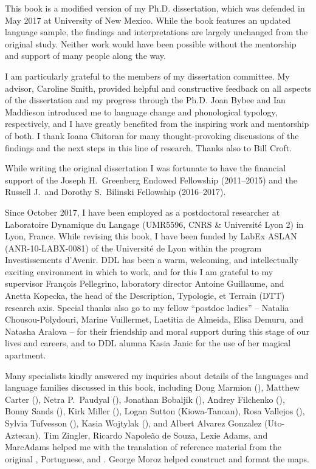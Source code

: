 \addchap{\lsAcknowledgementTitle} 

This book is a modified version of my Ph.D. dissertation, which was defended in May 2017 at University of New Mexico. While the book features an updated language sample, the findings and interpretations are largely unchanged from the original study. Neither work would have been possible without the mentorship and support of many people along the way.

I am particularly grateful to the members of my dissertation committee. My advisor, Caroline Smith, provided helpful and constructive feedback on all aspects of the dissertation and my progress through the Ph.D. Joan Bybee and Ian Maddieson introduced me to language change and phonological typology, respectively, and I have greatly benefited from the inspiring work and mentorship of both. I thank Ioana Chitoran for many thought-provoking discussions of the findings and the next steps in this line of research. Thanks also to Bill Croft.

While writing the original dissertation I was fortunate to have the financial support of the Joseph H.\ Greenberg Endowed Fellowship (2011--2015) and the Russell J.\ and Dorothy S.\ Bilinski Fellowship (2016--2017).

Since October 2017, I have been employed as a postdoctoral researcher at Laboratoire Dynamique du Langage (UMR5596, CNRS \& Université Lyon 2) in Lyon, France. While revising this book, I have been funded by LabEx ASLAN (ANR-10-LABX-0081) of the Université de Lyon within the  program Investissements d’Avenir. DDL has been a warm, welcoming, and intellectually exciting environment in which to work, and for this I am grateful to my supervisor François Pellegrino, laboratory director Antoine Guillaume, and Anetta Kopecka, the head of the Description, Typologie, et Terrain (DTT) research axis. Special thanks also go to my fellow ``postdoc ladies'' -- Natalia Chousou-Polydouri, Marine Vuillermet, Laetitia de Almeida, Elisa Demuru, and Natasha Aralova -- for their friendship and moral support during this stage of our lives and careers, and to DDL alumna Kasia Janic for the use of her magical apartment.

Many specialists kindly answered my inquiries about details of the languages and language families discussed in this book, including Doug Marmion (), Matthew Carter (), Netra P.\ Paudyal (), Jonathan Bobaljik (), Andrey Filchenko (), Bonny Sands (), Kirk Miller (), Logan Sutton (Kiowa-Tanoan), Rosa Vallejos (), Sylvia Tufvesson (), Kasia Wojtylak (), and Albert Alvarez Gonzalez (Uto-Az\-tecan). Tim Zingler, Ricardo Napoleão de Souza, Lexie Adams, and Marc\linebreak Adams helped me with the translation of reference material from the original , Portuguese, and . George Moroz helped construct and format the maps.

